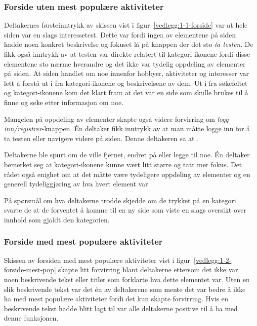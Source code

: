 \subsubsection{Forside uten mest populære aktiviteter}
\label{section:test-forside-1.0}
Deltakernes førsteinntrykk av skissen vist i figur~\ref{vedlegg:1-1-forside} var at hele siden var en slags interessetest. Dette var fordi ingen av elementene på siden hadde noen konkret beskrivelse og fokuset lå på knappen der det sto {\em ta testen}. De fikk også inntrykk av at testen var direkte relatert til kategori-ikonene fordi disse elementene sto nærme hverandre og det ikke var tydelig oppdeling av elementer på siden. At siden handlet om noe innenfor hobbyer, aktiviteter og interesser var lett å forstå ut i fra kategori-ikonene og beskrivelsene av dem. Ut i fra søkefeltet og kategori-ikonene kom det klart fram at det var en side som skulle brukes til å finne og søke etter informasjon om noe. 

Mangelen på oppdeling av elementer skapte også videre forvirring om {\em logg inn/registrer}-knappen. Én deltaker fikk inntrykk av at man måtte logge inn for å ta testen eller navigere videre på siden. Denne deltakeren sa at .

Deltakerne ble spurt om de ville fjernet, endret på eller legge til noe. Én deltaker bemerket seg at kategori-ikonene kunne vært litt større og tatt mer fokus. Det rådet også enighet om at det måtte være tydeligere oppdeling av elementer og en generell tydeliggjøring av hva hvert element var.

På spørsmål om hva deltakerne trodde skjedde om de trykket på en kategori svarte de at de forventet å komme til en ny side som viste en slags oversikt over innhold som gjaldt den kategorien.

\subsubsection{Forside med mest populære aktiviteter}
Skissen av forsiden med mest populære aktiviteter vist i figur~\ref{vedlegg:1-2-forside-mest-pop} skapte litt forvirring blant deltakerne ettersom det ikke var noen beskrivende tekst eller titler som forklarte hva dette elementet var. Uten en slik beskrivende tekst var det én av deltakerene som mente det var bedre å ikke ha med mest populære aktiviteter fordi det kun skapte forvirring. Hvis en beskrivende tekst hadde blitt lagt til var alle deltakerne positive til å ha med denne funksjonen. 

